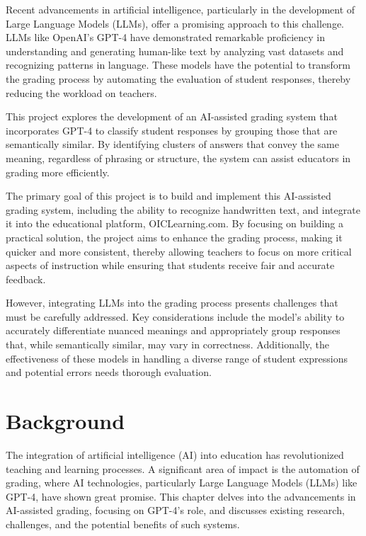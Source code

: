 \documentclass[ms,twoside,print]{nuthesis}
\begin{document}
Recent advancements in artificial intelligence, particularly in the development of Large Language Models (LLMs), offer a promising approach to this challenge. LLMs like OpenAI's GPT-4 have demonstrated remarkable proficiency in understanding and generating human-like text by analyzing vast datasets and recognizing patterns in language. These models have the potential to transform the grading process by automating the evaluation of student responses, thereby reducing the workload on teachers.

This project explores the development of an AI-assisted grading system that incorporates GPT-4 to classify student responses by grouping those that are semantically similar. By identifying clusters of answers that convey the same meaning, regardless of phrasing or structure, the system can assist educators in grading more efficiently.

The primary goal of this project is to build and implement this AI-assisted grading system, including the ability to recognize handwritten text, and integrate it into the educational platform, OICLearning.com. By focusing on building a practical solution, the project aims to enhance the grading process, making it quicker and more consistent, thereby allowing teachers to focus on more critical aspects of instruction while ensuring that students receive fair and accurate feedback.

However, integrating LLMs into the grading process presents challenges that must be carefully addressed. Key considerations include the model's ability to accurately differentiate nuanced meanings and appropriately group responses that, while semantically similar, may vary in correctness. Additionally, the effectiveness of these models in handling a diverse range of student expressions and potential errors needs thorough evaluation.

\chapter{Background}

The integration of artificial intelligence (AI) into education has revolutionized teaching and learning processes. A significant area of impact is the automation of grading, where AI technologies, particularly Large Language Models (LLMs) like GPT-4, have shown great promise. This chapter delves into the advancements in AI-assisted grading, focusing on GPT-4's role, and discusses existing research, challenges, and the potential benefits of such systems.
\end{document}
